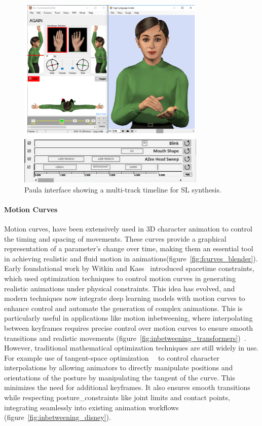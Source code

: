 \documentclass[../../main.tex]{subfiles}
\begin{document}
\begin{figure}[h]
    \centering
    \includegraphics[width=0.8\textwidth]{chapters/background_work/images/paula_multi_track.png}
    \caption{Paula interface showing a multi-track timeline for SL synthesis.}
    \label{fig:paula}
\end{figure}

\paragraph{Motion Curves}
\label{ch:background_work:sign_language_synthesis:3d_techniques:avatar_animation:motion_curves}

Motion curves, have been extensively used in 3D character animation to control the timing and spacing of movements. These curves provide a graphical representation of a parameter's change over time, making them an essential tool in achieving realistic and fluid motion in animations(figure~\ref{fig:fcurves_blender}). Early foundational work by Witkin and Kass~\cite{witkin1988spacetime} introduced spacetime constraints, which used optimization techniques to control motion curves in generating realistic animations under physical constraints. This idea has evolved, and modern techniques now integrate deep learning models with motion curves to enhance control and automate the generation of complex animations. This is particularly useful in applications like motion inbetweening, where interpolating between keyframes requires precise control over motion curves to ensure smooth transitions and realistic movements (figure~\ref{fig:inbetweening_transformers})~\cite{10.1145/3550454.3555454}. However, traditional mathematical optimization techniques are still widely in use. For example use of tangent-space optimization~~\cite{10.1145/3306346.3322938} to control character interpolations by allowing animators to directly manipulate positions and orientations of the posture by manipulating the tangent of the curve. This minimizes the need for additional keyframes. It also ensures smooth transitions while respecting \gls{posture_constraint}s like joint limits and contact points, integrating seamlessly into existing animation workflows (figure~\ref{fig:inbetweening_disney}). 
\end{document}
